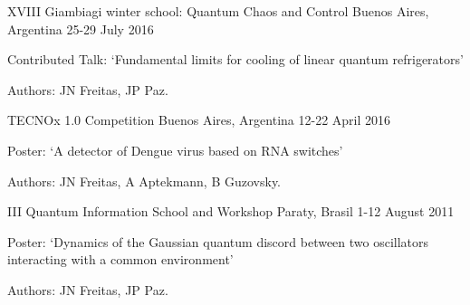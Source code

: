 \begin{confentries}
  \confentry
    {XVIII Giambiagi winter school: Quantum Chaos and Control} %
    {Buenos Aires, Argentina} %
    {25-29 July 2016} %
    {
    \begin{cvitems}
    \item Contributed Talk: ‘Fundamental limits for cooling of linear quantum refrigerators’
    \item Authors: JN Freitas, JP Paz.
    \end{cvitems}
    }

  \confentry
    {TECNOx 1.0 Competition} %
    {Buenos Aires, Argentina} %
    {12-22 April 2016} %
    {
    \begin{cvitems}
    \item Poster: ‘A detector of Dengue virus based on RNA switches’
    \item Authors: JN Freitas, A Aptekmann, B Guzovsky.
    \end{cvitems}
    }

  \confentry
    {III Quantum Information School and Workshop} %
    {Paraty, Brasil} %
    {1-12 August 2011} %
    {
    \begin{cvitems}
    \item Poster: ‘Dynamics of the Gaussian quantum discord between two oscillators interacting with a common environment'
    \item Authors: JN Freitas, JP Paz.
    \end{cvitems}
    }

\end{confentries}
